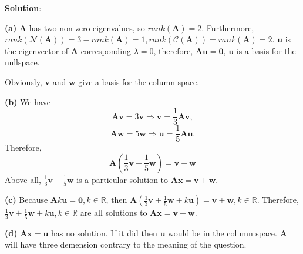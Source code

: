 \documentclass[12pt, a4paper, UTF8]{ctexart}
\begin{document}
\begin{enumerate}
		\textbf{Solution}:

		\textbf{(a)}
		$\bm{A}$ has two non-zero eigenvalues, so $rank(\bm{A}) = 2$. Furthermore, $rank(\mathcal{N}(\bm{A})) = 3 - rank(\bm{A}) = 1, rank(\mathcal{C}(\bm{A})) = rank(\bm{A}) = 2$. $\bm{u}$ is the eigenvector of $\bm{A}$ corresponding $\lambda = 0$, therefore, $\bm{A} \bm{u} = \bm{0}$, $\bm{u}$ is a basis for the nullspace.
		
		Obviously, $\bm{v}$ and $\bm{w}$ give a basis for the column space.

		\textbf{(b)}
		We have 
		\begin{equation*}
			\bm{A}\bm{v} = 3\bm{v} \Longrightarrow \bm{v} = \frac{1}{3}\bm{A}\bm{v},
		\end{equation*}
		\begin{equation*}
			\bm{A}\bm{w} = 5\bm{w} \Longrightarrow \bm{u} = \frac{1}{5}\bm{A}\bm{u}.
		\end{equation*}
		Therefore,
		\begin{equation*}
			\bm{A}(\frac{1}{3}\bm{v}+\frac{1}{5}\bm{w}) = \bm{v} + \bm{w}
		\end{equation*}
		Above all, $\frac{1}{3}\bm{v}+\frac{1}{5}\bm{w}$ is a particular solution to $\bm{Ax}=\bm{v}+\bm{w}$.

		\textbf{(c)}
		Because $\bm{A} k \bm{u} = \bm{0}, k \in \mathbb{R}$, then $\bm{A}(\frac{1}{3}\bm{v}+\frac{1}{5}\bm{w}+k\bm{u}) = \bm{v} + \bm{w}, k \in \mathbb{R}$.
		Therefore, $\frac{1}{3}\bm{v}+\frac{1}{5}\bm{w}+k\bm{u}, k \in \mathbb{R}$ are all solutions to $\bm{Ax}=\bm{v}+\bm{w}$.
		
		\textbf{(d)}
		$\bm{Ax}=\bm{u}$ has no solution. If it did then $\bm{u}$ would be in the column space. $\bm{A}$ will have three demension contrary to the meaning of the question.
		
	\end{enumerate}
	
	
	
	
\end{document}
